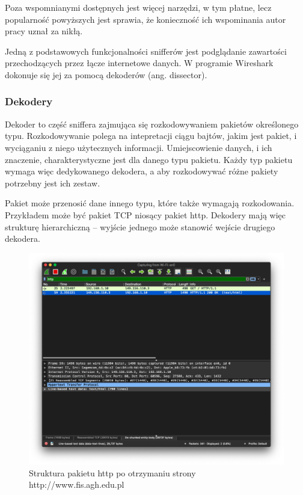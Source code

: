 \documentclass[a4paper, 12pt, twoside, openright]{article}
\begin{document}
	Poza wspomnianymi dostępnych jest więcej narzędzi, w tym płatne, lecz popularność powyższych jest sprawia,
	że konieczność ich wspominania autor pracy uznał za nikłą.

	Jedną z podstawowych funkcjonalności snifferów jest podglądanie zawartości przechodzących przez łącze internetowe danych.
	W programie Wireshark dokonuje się jej za pomocą dekoderów (ang. dissector).

	\newpage
	\subsubsection{Dekodery}
	\indent\par
	Dekoder to część sniffera zajmująca się rozkodowywaniem pakietów określonego typu. Rozkodowywanie polega na intepretacji
	ciągu bajtów, jakim jest pakiet, i wyciąganiu z niego użytecznych informacji. Umiejscowienie danych, i ich znaczenie,
	charakterystyczne jest dla danego typu pakietu. Każdy typ pakietu wymaga więc dedykowanego dekodera, a aby rozkodowywać
	różne pakiety potrzebny jest ich zestaw. 

	Pakiet może przenosić dane innego typu, które także wymagają rozkodowania. Przykładem może być pakiet TCP niosący pakiet
	http. Dekodery mają więc strukturę hierarchiczną -- wyjście jednego może stanowić wejście drugiego dekodera.

	\begin{figure}[h]
		\centering
			\includegraphics[width=1.0\textwidth]{img/screenshot_fis.png}
		\caption{Struktura pakietu http po otrzymaniu strony http://www.fis.agh.edu.pl}
		\label{fig:fis}
	\end{figure}
\end{document}
